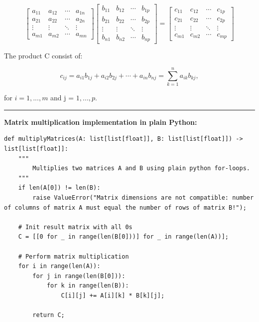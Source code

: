 \documentclass[12pt]{article}
\begin{document}
\begin{equation*}
    \begin{bmatrix}
        a_{11} & a_{12} & \cdots & a_{1n} \\
        a_{21} & a_{22} & \cdots & a_{2n} \\
        \vdots & \vdots & \ddots & \vdots \\
        a_{m1} & a_{m2} & \cdots & a_{mn}
    \end{bmatrix}
    \begin{bmatrix}
        b_{11} & b_{12} & \cdots & b_{1p} \\
        b_{21} & b_{22} & \cdots & b_{2p} \\
        \vdots & \vdots & \ddots & \vdots \\
        b_{n1} & b_{n2} & \cdots & b_{np}
    \end{bmatrix}
    =
    \begin{bmatrix}
        c_{11} & c_{12} & \cdots & c_{1p} \\
        c_{21} & c_{22} & \cdots & c_{2p} \\
        \vdots & \vdots & \ddots & \vdots \\
        c_{m1} & c_{m2} & \cdots & c_{mp}
    \end{bmatrix}
\end{equation*}

\noindent The product C consist of:

\begin{equation*}
    c_{ij} = a_{i1}b_{1j} + a_{i2}b_{2j} + \cdots + a_{in}b_{nj} = \sum_{k=1}^{n} a_{ik}b_{kj},
\end{equation*}

\noindent for \( i = 1, ..., m \) and j = \( 1, ..., p \). \\

\noindent\rule{\textwidth}{0.4pt}
\noindent\textbf{Matrix multiplication implementation in plain Python:}
\begin{lstlisting}
def multiplyMatrices(A: list[list[float]], B: list[list[float]]) -> list[list[float]]:
    """
        Multiplies two matrices A and B using plain python for-loops.
    """
    if len(A[0]) != len(B):
        raise ValueError("Matrix dimensions are not compatible: number of columns of matrix A must equal the number of rows of matrix B!");

    # Init result matrix with all 0s
    C = [[0 for _ in range(len(B[0]))] for _ in range(len(A))];

    # Perform matrix multiplication
    for i in range(len(A)):
        for j in range(len(B[0])):
            for k in range(len(B)):
                C[i][j] += A[i][k] * B[k][j];

        return C;
\end{lstlisting}
\end{document}
